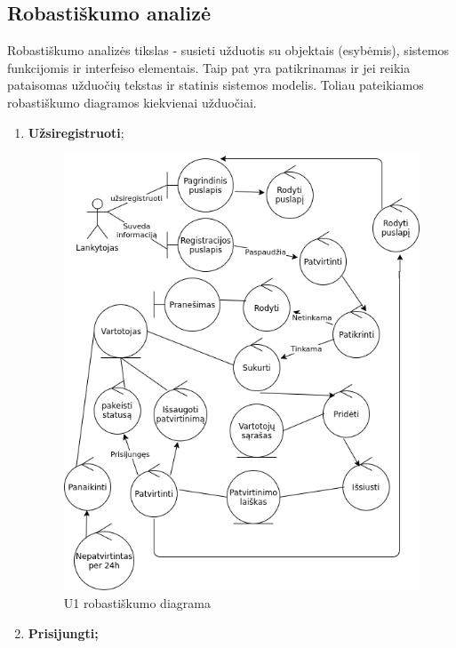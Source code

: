 \documentclass{VUMIFPSkursinis}
\begin{document}
	\subsection{Robastiškumo analizė}
		Robastiškumo analizės tikslas - susieti užduotis su objektais (esybėmis), sistemos funkcijomis ir 
		interfeiso elementais. Taip pat yra patikrinamas ir jei reikia pataisomas užduočių tekstas ir statinis sistemos modelis.
		Toliau pateikiamos robastiškumo diagramos kiekvienai užduočiai.
		\begin{enumerate}[label=\textbf{U\arabic*.}]
			\item \textbf{Užsiregistruoti};		
				\begin{figure}[H]
					\centering
					\includegraphics[scale=0.9]{img/U1.png}
					\caption{U1 robastiškumo diagrama}
					\label{img:psi2-u1-robustness}
				\end{figure}
			\item \textbf{Prisijungti;}
				\begin{figure}[H]
					\centering

\end{figure}
\end{enumerate}
\end{document}
